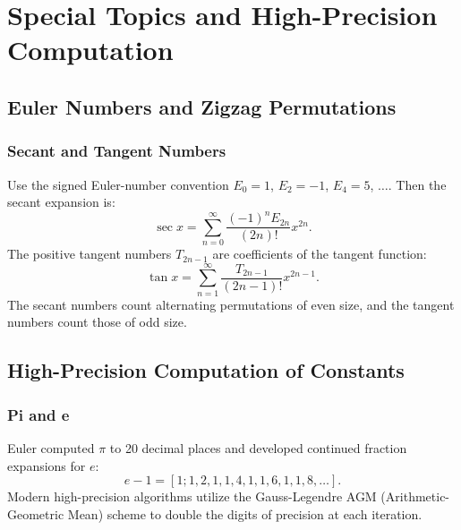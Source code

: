 \documentclass[11pt,a4paper,twoside]{book}
\theoremstyle{eulerstyle}
\theoremstyle{definition}
\begin{document}
\cleardoublepage

\part{Special Topics and High-Precision Computation}
\label{part:special_topics}

\chapter{Euler Numbers and Zigzag Permutations}
\label{ch:euler_numbers}

\section{Secant and Tangent Numbers}
Use the signed Euler-number convention $E_0=1$, $E_2=-1$, $E_4=5$, $\dots$.
Then the secant expansion is:
\[
\sec x = \sum_{n=0}^\infty \frac{(-1)^n E_{2n}}{(2n)!} x^{2n}.
\]
The positive tangent numbers $T_{2n-1}$ are coefficients of the tangent function:
\[
\tan x = \sum_{n=1}^\infty \frac{T_{2n-1}}{(2n-1)!} x^{2n-1}.
\]
The secant numbers count alternating permutations of even size, and the tangent
numbers count those of odd size.

\cleardoublepage

\chapter{High-Precision Computation of Constants}
\label{ch:high_precision}

\section{Pi and e}
Euler computed $\pi$ to 20 decimal places and developed continued fraction expansions for $e$:
\[
e - 1 = [1; 1, 2, 1, 1, 4, 1, 1, 6, 1, 1, 8, \dots].
\]
Modern high-precision algorithms utilize the Gauss-Legendre AGM (Arithmetic-Geometric Mean) scheme to double the digits of precision at each iteration.
\end{document}
